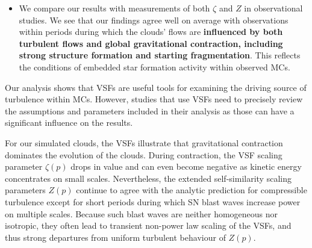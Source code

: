 \begin{itemize}
	\item We compare our results with measurements of both $\zeta$ and $Z$ in observational studies. We see that our findings agree well on average with observations within periods during which the clouds' flows are \textbf{influenced by both turbulent flows and global gravitational contraction, including strong structure formation and starting fragmentation}. This reflects the conditions of embedded star formation activity within observed MCs.
\end{itemize}

Our analysis shows that VSFs are useful tools for examining the driving source of turbulence within MCs.
However, studies that use VSFs need to precisely review the assumptions and parameters included in their analysis as those can have a significant influence on the results.

For our simulated clouds, the VSFs illustrate that gravitational contraction dominates the evolution of the clouds.
During contraction, the VSF scaling parameter $\zeta(p)$ drops in value and can even become negative as kinetic energy concentrates on small scales.
Nevertheless, the extended self-similarity scaling parameters $Z(p)$ continue to agree with the analytic prediction for compressible turbulence except for short periods during which SN blast waves increase power on multiple scales.
Because such blast waves are neither homogeneous nor isotropic, they often lead to transient non-power law scaling of the VSFs, and thus strong departures from uniform turbulent behaviour of $Z(p)$.


\endinput
